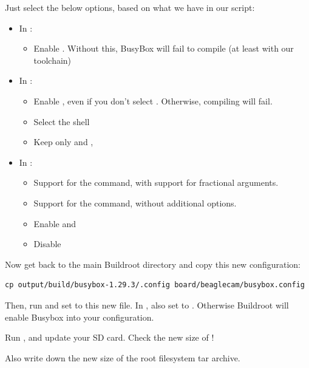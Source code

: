 Just select the below options, based on what we have in our
 script:
\begin{itemize}
  \item In :
  \begin{itemize}
     \item Enable . Without this, BusyBox
           will fail to compile (at least with our toolchain)
  \end{itemize}
  \item In :
  \begin{itemize}
     \item Enable , even
	   if you don't select . Otherwise, compiling
            will fail. 
     \item Select the  shell
     \item Keep only  and
           ,
  \end{itemize}
  \item In :
  \begin{itemize}
     \item Support for the  command, with support for fractional arguments.
     \item Support for the  command, without additional options.
     \item Enable  and \code{test as [}
     \item Disable 
  \end{itemize}
\end{itemize}

Now get back to the main Buildroot directory and copy this new
configuration:

\begin{verbatim}
cp output/build/busybox-1.29.3/.config board/beaglecam/busybox.config
\end{verbatim}

Then, run  and set
 to this new file. In , also set  to . Otherwise
Buildroot will enable Busybox  into your configuration.

Run , and update your SD card.
Check the new size of !

Also write down the new size of the root filesystem tar archive.

